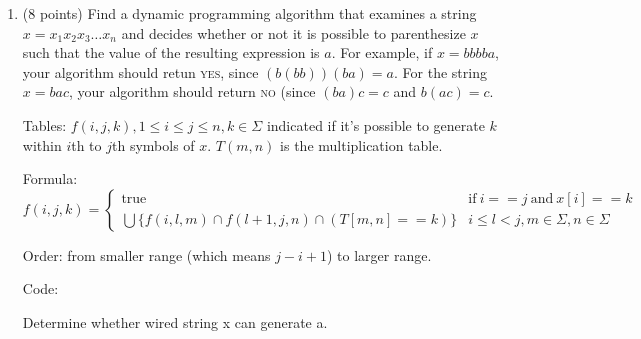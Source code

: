 \documentclass[paper=a4, fontsize=11pt]{scrartcl} %
\begin{document}
\begin{enumerate}
\item
  \begin{fancyquotes}
    (8 points) Find a dynamic programming algorithm that examines a
    string $x = x_1x_2x_3\ldots x_n$ and decides whether or not it is
    possible to parenthesize $x$ such that the value of the resulting
    expression is $a$. For example, if $x = bbbba$, your algorithm
    should retun \textsc{yes}, since $(b(bb))(ba) = a$. For the string $x =
    bac$, your algorithm should return \textsc{no} (since $(ba)c = c$ and
    $b(ac) = c$.
  \end{fancyquotes}

  Tables:
  $f(i,j,k), 1\leq i\leq j\leq n, k\in \Sigma$ indicated if it's
  possible to generate $k$ within $i$th to $j$th symbols of $x$.
  $T(m,n)$ is the multiplication table.

  Formula:
  \begin{equation*}
    f(i,j,k)=
    \begin{cases}
      \text{true} & \text{if}\ i==j\ \text{and}\ x[i]==k\\
      \bigcup\{f(i,l,m) \cap f(l+1,j,n) \cap (T[m, n] == k)\} &
      i\leq l<j, m\in\Sigma ,n\in\Sigma
    \end{cases}
  \end{equation*}

  Order: from smaller range (which means $j-i+1$) to larger range.

  Code:

  \begin{algorithm}[H]
    \caption{Determine whether wired string x can generate a.}
  \end{algorithm}



\end{enumerate}
\end{document}
